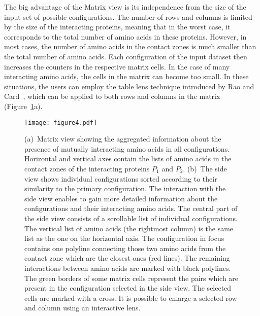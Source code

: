\documentclass[twocolumn]{bmcart}%
\def\MatView {Matrix view\xspace}
\begin{document}
The big advantage of the \MatView is its independence from the size of the input set of possible configurations.
The number of rows and columns is limited by the size of the interacting proteins, meaning that in the worst case, it corresponds to the total number of amino acids in these proteins.
However, in most cases, the number of amino acids in the contact zones is much smaller than the total number of amino acids.
Each configuration of the input dataset then increases the counters in the respective matrix cells.
In the case of many interacting amino acids, the cells in the matrix can become too small.
In these situations, the users can employ the table lens technique introduced by Rao and Card~\cite{Rao1994}, which can be applied to both rows and columns in the matrix (Figure~\ref{fig:matrixlens}a).

\begin{figure}[tb]
  \centering
  \texttt{[image: figure4.pdf]}
  \caption{
  (a)~\MatView showing the aggregated information about the presence of mutually interacting amino acids in all configurations. Horizontal and vertical axes contain the lists of amino acids in the contact zones of the interacting proteins $P_1$ and $P_2$. (b)~The side view shows individual configurations sorted according to their similarity to the primary configuration. The interaction with the side view enables to gain more detailed information about the configurations and their interacting amino acids. The central part of the side view consists of a scrollable list of individual configurations. The vertical list of amino acids (the rightmost column) is the same list as the one on the horizontal axis. The configuration in focus contains one polyline connecting those two amino acids from the contact zone which are the closest ones (red lines). The remaining interactions between amino acids are marked with black polylines. The green borders of some matrix cells represent the pairs which are present in the configuration selected in the side view. The selected cells are marked with a cross. It is possible to enlarge a selected row and column using an interactive lens.}
  \label{fig:matrixlens}
\end{figure}
\end{document}
